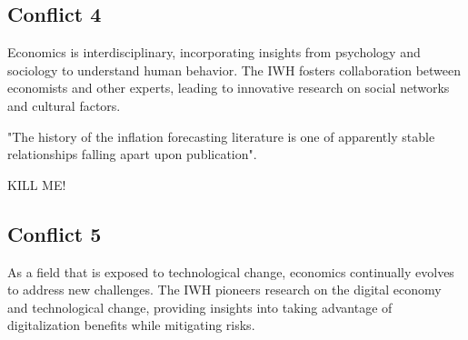 \documentclass{article}
\begin{document}
\subsection{Conflict 4}
Economics is interdisciplinary, incorporating insights from psychology and sociology to understand human behavior. The IWH fosters collaboration between economists and other experts, leading to innovative research on social networks and cultural factors.

"The history of the inflation forecasting literature is one of apparently stable relationships falling apart upon publication".

KILL ME!

\subsection{Conflict 5}
As a field that is exposed to technological change, economics continually evolves to address new challenges. The IWH pioneers research on the digital economy and technological change, providing insights into taking advantage of digitalization benefits while mitigating risks.
\end{document}
